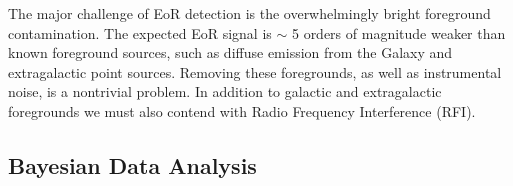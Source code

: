 \documentclass[a0,landscape]{a0poster}
\begin{document}
\begin{multicols}{4}
The major challenge of EoR detection is the overwhelmingly bright foreground contamination. The expected EoR signal is $\sim$ 5 orders of magnitude weaker than known foreground sources, such as diffuse emission from the Galaxy and extragalactic point sources. Removing these foregrounds, as well as instrumental noise, is a nontrivial problem. In addition to galactic and extragalactic foregrounds we must also contend with Radio Frequency Interference (RFI).





\subsection*{Bayesian Data Analysis}


\end{multicols}
\end{document}
